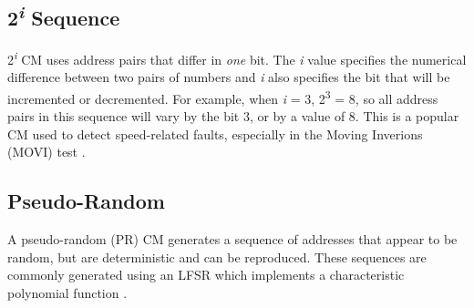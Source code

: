\subsection{2\textsuperscript{\textit{i}} Sequence}
2\textsuperscript{\textit{i}} CM uses address pairs that differ in \textit{one} bit.  The \textit{i} value specifies the numerical difference between two pairs of numbers and \textit{i} also specifies the bit that will be incremented or decremented.  For example, when \textit{i} = 3, 2\textsuperscript{3} = 8, so all address pairs in this sequence will vary by the bit 3, or by a value of 8.  This is a popular CM used to detect speed-related faults, especially in the Moving Inverions (MOVI) test \cite{5941430}.

\subsection{Pseudo-Random}
A pseudo-random (PR) CM generates a sequence of addresses that appear to be random, but are deterministic and can be reproduced.  These sequences are commonly generated using an LFSR which implements a characteristic polynomial function \cite{VanDeGoor1991}.  


